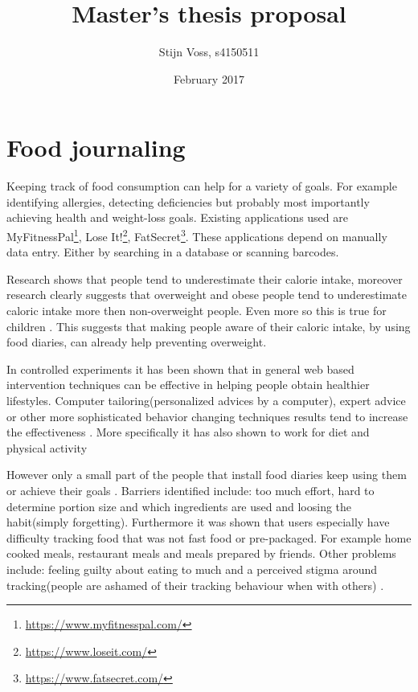 \documentclass[a4paper]{scrartcl}
\title{Master's thesis proposal}
\author{Stijn Voss, s4150511 }
\date{February 2017}
\begin{document}
\maketitle

\section{Food journaling}
Keeping track of food consumption can help for a variety of goals. For example identifying allergies, detecting deficiencies but probably most importantly achieving health and weight-loss goals. Existing applications used are MyFitnessPal\footnote{\url{https://www.myfitnesspal.com/}}, Lose It!\footnote{\url{https://www.loseit.com/}}, FatSecret\footnote{\url{https://www.fatsecret.com/}}. These applications depend on manually data entry. Either by searching in a database or scanning barcodes. 

Research shows that people tend to underestimate their calorie intake\cite{schoeller1990inaccuracies}, moreover research clearly suggests that overweight and obese people tend to underestimate caloric intake more then non-overweight people\cite{pikholz2004under, garriguet2008under}. Even more so this is true for children \cite{forrestal2011energy}. This suggests that making people aware of their caloric intake, by using food diaries,   can already help preventing overweight.\

In controlled experiments it has been shown that in general web based intervention techniques can be effective in helping people obtain healthier lifestyles.  Computer tailoring(personalized advices by a computer), expert advice or other more sophisticated behavior changing techniques results tend to increase the effectiveness \cite{lustria2009computer,kroeze2006systematic,gold2007weight,webb2010using,lustria2013meta}. More specifically it has also shown to work for diet and physical activity \cite{turner2013comparison,wharton2014dietary}

However only a small part of the people that install food diaries keep using them or achieve their goals\cite{helander2014factors} . Barriers identified include: too much effort, hard to determine portion size and which ingredients are used and loosing the habit(simply forgetting). Furthermore it was shown that users especially have difficulty tracking food that was not fast food or pre-packaged. For example home cooked meals, restaurant meals and meals prepared by friends. Other problems include: feeling guilty about eating to much and a perceived stigma around tracking(people are ashamed of their tracking behaviour when with others)  \cite{cordeiro2015barriers}. 
\end{document}
